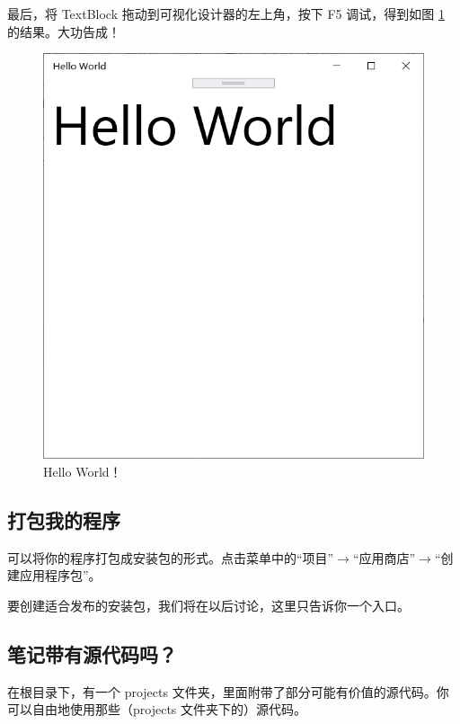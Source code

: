 最后，将 TextBlock 拖动到可视化设计器的左上角，按下 F5 调试，得到如图 \ref{pic13} 的结果。大功告成！
\begin{figure}[htbp]
    \centering
    \includegraphics[width = 0.5\paperwidth]{pic/13.png}
    \caption{Hello World！}
    \label{pic13}
\end{figure}

\subsection{打包我的程序}

可以将你的程序打包成安装包的形式。点击菜单中的``项目''$\rightarrow$``应用商店''$\rightarrow$``创建应用程序包''。

要创建适合发布的安装包，我们将在以后讨论，这里只告诉你一个入口。

\subsection{笔记带有源代码吗？}

在根目录下，有一个 projects 文件夹，里面附带了部分可能有价值的源代码。你可以自由地使用那些（projects 文件夹下的）源代码。